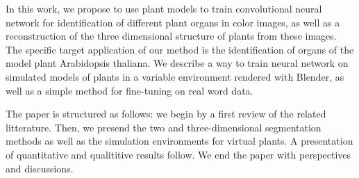 In this work, we propose to use plant models to train convolutional neural network for
identification of different plant organs in color images, as well as a
reconstruction of the three dimensional structure of plants from these images.
The specific target application of our method is the identification of organs of the model
plant Arabidopsis thaliana. We describe a way to train neural network on simulated models of
plants in a variable environment rendered with Blender, as well as a simple method for
fine-tuning on real word data. 

The paper is structured as follows: we begin by a first review of the related
litterature. Then, we presend the two and three-dimensional segmentation methods
as well as the simulation environments for virtual plants. A presentation of
quantitative and qualititive results follow. We end the paper with perspectives
and discussions.
